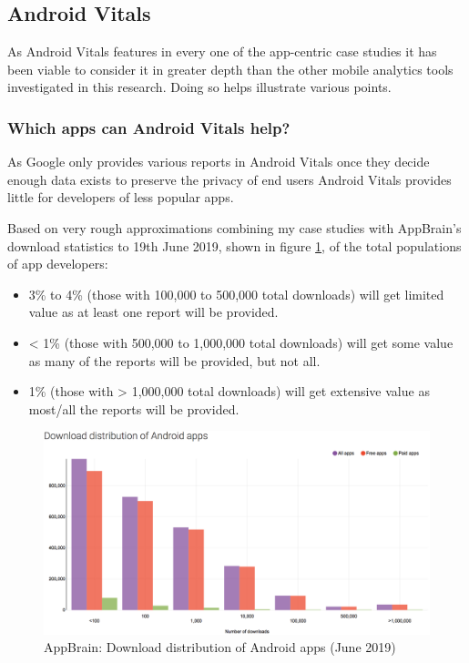 \subsection{Android Vitals}
As Android Vitals features in every one of the app-centric case studies it has been viable to consider it in greater depth than the other mobile analytics tools investigated in this research. Doing so helps illustrate various points.

\subsubsection{Which apps can Android Vitals help?}
As Google only provides various reports in Android Vitals once they decide enough data exists to preserve the privacy of end users Android Vitals provides little for developers of less popular apps. 

Based on very rough approximations combining my case studies with AppBrain's download statistics to 19th June 2019, shown in figure \ref{fig:appbrain_download_statistics_jun_2019}\cite{appbrain_download_statistics_june_2019}, of the total populations of app developers:
\begin{itemize}
    \item 3\% to 4\% (those with 100,000 to 500,000 total downloads) will get limited value as at least one report will be provided.
    \item < 1\% (those with 500,000 to 1,000,000 total downloads) will get some value as many of the reports will be provided, but not all.
    \item 1\% (those with > 1,000,000 total downloads) will get extensive value as most/all the reports will be provided.
\end{itemize}

\begin{figure}[!htbp]
    \centering
    \includegraphics[width=\textwidth, keepaspectratio]{images/appbrain/AppBrain_Download_Statistics_20-Jun-2019.png}
    \caption{AppBrain: Download distribution of Android apps (June 2019)}
    \label{fig:appbrain_download_statistics_jun_2019}
\end{figure}

